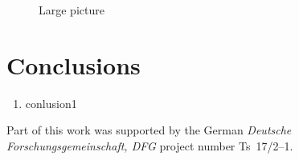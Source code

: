 \documentclass{ref/aa}
\begin{document}
   \begin{figure*}
   \centering
   \caption{Large picture}%
    \end{figure*}
%

\section{Conclusions}

   \begin{enumerate}
      \item conlusion1
   \end{enumerate}

\begin{acknowledgements}
      Part of this work was supported by the German
      \emph{Deut\-sche For\-schungs\-ge\-mein\-schaft, DFG\/} project
      number Ts~17/2--1.
\end{acknowledgements}




%
\end{document}
